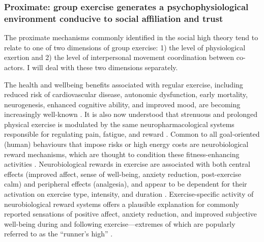 \begin{CJK}{UTF8}{gbsn}
\subsubsection{Proximate: group exercise generates a psychophysiological environment conducive to social affiliation and trust}

The proximate mechanisms commonly identified in the social high theory tend to relate to one of two dimensions of group exercise: 1) the level of physiological exertion and 2) the level of interpersonal movement coordination between co-actors.  I will deal with these two dimensions separately.

The health and wellbeing benefits associated with regular exercise, including reduced risk of cardiovascular disease, autonomic dysfunction, early mortality, neurogenesis, enhanced cognitive ability, and improved mood, are becoming increasingly well-known \citep{Blair1994,Nagamatsu2014}.  It is also now understood that strenuous and prolonged physical exercise is modulated by the same neuropharmacological systems responsible for regulating pain, fatigue, and reward \citep{Boecker2008,Raichlen2013}.  Common to all goal-oriented (human) behaviours that impose risks or high energy costs are neurobiological reward mechanisms, which are thought to condition these fitness-enhancing activities \citep{Burgdorf2006}.  Neurobiological rewards in exercise are associated with both central effects (improved affect, sense of well-being, anxiety reduction, post-exercise calm) and peripheral effects (analgesia), and appear to be dependent for their activation on exercise type, intensity, and duration \citep{Dietrich2004}.  Exercise-specific activity of neurobiological reward systems offers a plausible explanation for commonly reported sensations of positive affect, anxiety reduction, and improved subjective well-being during and following exercise---extremes of which are popularly referred to as the ``runner's high'' \citep{(Dietrich2004,Boecker2008,Raichlen2012}.


\end{CJK}
